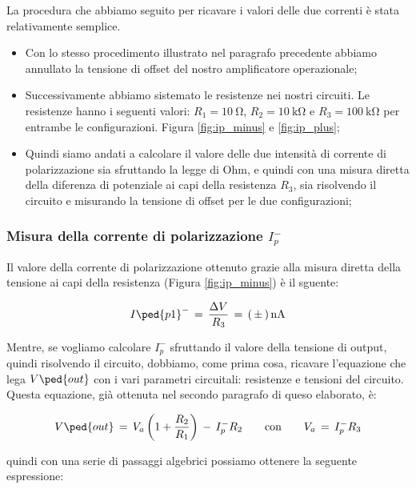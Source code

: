 La procedura che abbiamo seguito per ricavare i valori delle due correnti è stata relativamente semplice.
\begin{itemize}\itemsep2pt \parskip0pt 
	\item{Con lo stesso procedimento illustrato nel paragrafo precedente abbiamo annullato la tensione di offset del nostro amplificatore operazionale;}
	\item{Successivamente abbiamo sistemato le resistenze nei nostri circuiti. Le resistenze hanno i seguenti valori: $R_1=\SI{10}{\ohm}$, $R_2=\SI{10}{\kilo\ohm}$ e $R_3=\SI{100}{\kilo\ohm}$ per entrambe le configurazioni. Figura \ref{fig:ip_minus} e \ref{fig:ip_plus};}
	\item{Quindi siamo andati a calcolare il valore delle due intensità di corrente di polarizzazione sia sfruttando la legge di Ohm, e quindi con una misura diretta della diferenza di potenziale ai capi della resistenza $R_3$, sia risolvendo il circuito e misurando la tensione di offset per le due configurazioni;}
\end{itemize}

\subsubsection*{Misura della corrente di polarizzazione $I_{p}^-$}

Il valore della corrente di polarizzazione ottenuto grazie alla misura diretta della tensione ai capi della resistenza (Figura \ref{fig:ip_minus}) è il sguente:

\begin{equation}
	I\ped{p1}^-\,=\,\frac{\Delta V}{R_3}\,=\,(\,\pm\,)\,\SI{}{\nano\ampere}
\end{equation}

Mentre, se vogliamo calcolare $I_{p}^-$ sfruttando il valore della tensione di output, quindi risolvendo il circuito, dobbiamo, come prima cosa, ricavare l'equazione che lega $V\ped{out}$ con i vari parametri circuitali: resistenze e tensioni del circuito. Questa equazione, già ottenuta nel secondo paragrafo di queso elaborato, è:

\begin{equation}
	V\ped{out}\,=\,V_a\left(1+\frac{R_2}{R_1}\right)\,-\,I_{p}^-R_2 \qquad \text{con} \qquad V_a\,=\,I_{p}^-R_3
\end{equation}

quindi con una serie di passaggi algebrici possiamo ottenere la seguente espressione:


